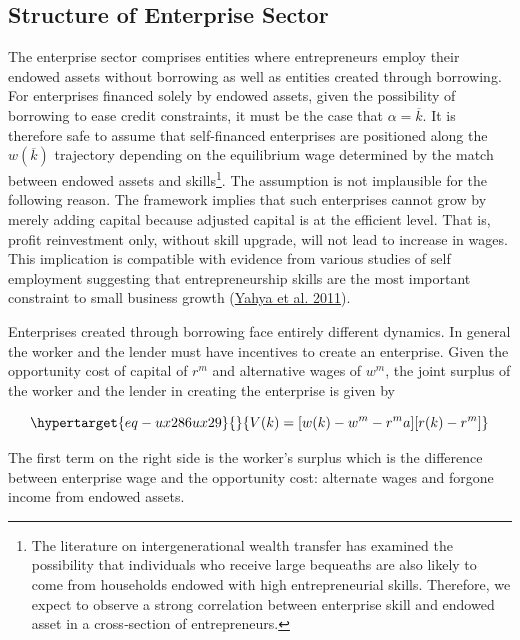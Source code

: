 \documentclass[
  a4paper,
  DIV=11,
  numbers=noendperiod]{scrartcl}
\begin{document}
\hypertarget{structure-of-enterprise-sector}{%
\subsection{Structure of Enterprise
Sector}\label{structure-of-enterprise-sector}}

The enterprise sector comprises entities where entrepreneurs employ
their endowed assets without borrowing as well as entities created
through borrowing. For enterprises financed solely by endowed assets,
given the possibility of borrowing to ease credit constraints, it must
be the case that \(\alpha = \overline{k}.\) It is therefore safe to
assume that self-financed enterprises are positioned along the
\(w(\overline{k})\) trajectory depending on the equilibrium wage
determined by the match between endowed assets and skills\footnote{The
  literature on intergenerational wealth transfer has examined the
  possibility that individuals who receive large bequeaths are also
  likely to come from households endowed with high entrepreneurial
  skills. Therefore, we expect to observe a strong correlation between
  enterprise skill and endowed asset in a cross‐section of
  entrepreneurs.}. The assumption is not implausible for the following
reason. The framework implies that such enterprises cannot grow by
merely adding capital because adjusted capital is at the efficient
level. That is, profit reinvestment only, without skill upgrade, will
not lead to increase in wages. This implication is compatible with
evidence from various studies of self employment suggesting that
entrepreneurship skills are the most important constraint to small
business growth (\protect\hyperlink{ref-yahya2011}{Yahya et al. 2011}).

Enterprises created through borrowing face entirely different dynamics.
In general the worker and the lender must have incentives to create an
enterprise. Given the opportunity cost of capital of \(r^m\) and
alternative wages of \(w^m\), the joint surplus of the worker and the
lender in creating the enterprise is given by

\begin{equation}\protect\hypertarget{eq-ux286ux29}{}{
V(k) = [w(k)-w^m -r^ma][r(k)-r^m]
}\label{eq-(6)}\end{equation}

The first term on the right side is the worker's surplus which is the
difference between enterprise wage and the opportunity cost: alternate
wages and forgone income from endowed assets.
\end{document}
